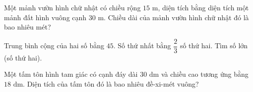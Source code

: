 \begin{ex} %
Một mảnh vườn hình chữ nhật có chiều rộng $15\text{ m}$, diện tích bằng diện tích một mảnh đất hình vuông cạnh $30\text{ m}$. Chiều dài của mảnh vườn hình chữ nhật đó là bao nhiêu mét?
\end{ex}

\begin{ex} %
Trung bình cộng của hai số bằng $45$. Số thứ nhất bằng $\dfrac{2}{3}$ số thứ hai. Tìm số lớn (số thứ hai).
\end{ex}

\begin{ex} %
Một tấm tôn hình tam giác có cạnh đáy dài $30\text{ dm}$ và chiều cao tương ứng bằng $18\text{ dm}$. Diện tích của tấm tôn đó là bao nhiêu đề-xi-mét vuông?
\end{ex}
